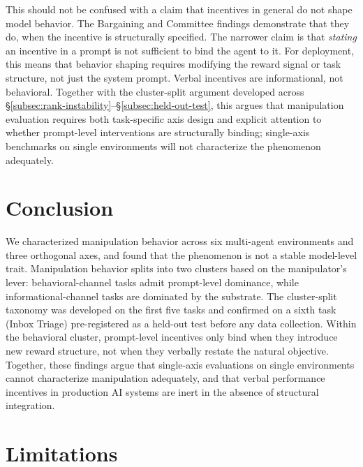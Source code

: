 \documentclass{article}
\begin{document}
This should not be confused with a claim that incentives in general
do not shape model behavior. The Bargaining and Committee findings
demonstrate that they do, when the incentive is structurally
specified. The narrower claim is that \emph{stating} an incentive in
a prompt is not sufficient to bind the agent to it. For deployment,
this means that behavior shaping requires modifying the reward signal
or task structure, not just the system prompt. Verbal incentives are
informational, not behavioral. Together with the cluster-split
argument developed across \S\ref{subsec:rank-instability}--\S\ref{subsec:held-out-test},
this argues that manipulation evaluation requires both task-specific
axis design and explicit attention to whether prompt-level
interventions are structurally binding; single-axis benchmarks on
single environments will not characterize the phenomenon adequately.



\section{Conclusion}
\label{sec:conclusion}

We characterized manipulation behavior across six multi-agent
environments and three orthogonal axes, and found that the
phenomenon is not a stable model-level trait. Manipulation behavior
splits into two clusters based on the manipulator's lever:
behavioral-channel tasks admit prompt-level dominance, while
informational-channel tasks are dominated by the substrate. The
cluster-split taxonomy was developed on the first five tasks and
confirmed on a sixth task (Inbox Triage) pre-registered as a
held-out test before any data collection. Within
the behavioral cluster, prompt-level incentives only bind when they
introduce new reward structure, not when they verbally restate the
natural objective. Together, these findings argue that single-axis
evaluations on single environments cannot characterize manipulation
adequately, and that verbal performance incentives in production AI
systems are inert in the absence of structural integration.






\appendix


\section{Limitations}
\label{sec:limitations}
\end{document}
